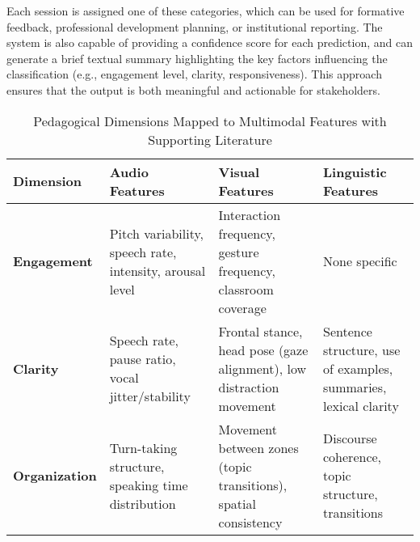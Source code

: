 Each session is assigned one of these categories, which can be used for formative feedback, professional development planning, or institutional reporting. The system is also capable of providing a confidence score for each prediction, and can generate a brief textual summary highlighting the key factors influencing the classification (e.g., engagement level, clarity, responsiveness). This approach ensures that the output is both meaningful and actionable for stakeholders.

\sloppy %
\begin{table*}[htbp]
\centering
\renewcommand{\arraystretch}{1.5} %
\setlength{\tabcolsep}{8pt} %
\caption{Pedagogical Dimensions Mapped to Multimodal Features with Supporting Literature}
\begin{tabularx}{\textwidth}{|>{\raggedright\arraybackslash}X|>{\raggedright\arraybackslash}X|>{\raggedright\arraybackslash}X|>{\raggedright\arraybackslash}X|}
\hline
	\textbf{\normalsize Dimension} & \textbf{\normalsize Audio Features} & \textbf{\normalsize Visual Features} & \textbf{\normalsize Linguistic Features} \\
\hline

	\textbf{Engagement} & 
Pitch variability, speech rate, intensity, arousal level \cite{hou2024encouragement, dmello2012multimodal} & 
Interaction frequency, gesture frequency, classroom coverage \cite{mcneill1992hand, ochoa2016multimodal} & 
None specific \cite{hou2024encouragement, dmello2012multimodal} \\
\hline

	\textbf{Clarity} & 
Speech rate, pause ratio, vocal jitter/stability \cite{falcon2024discourse, rowe1986wait} & 
Frontal stance, head pose (gaze alignment), low distraction movement \cite{mcneill1992hand, ochoa2016multimodal} & 
Sentence structure, use of examples, summaries, lexical clarity \cite{falcon2024discourse, rowe1986wait} \\
\hline

	\textbf{Organization} & 
Turn-taking structure, speaking time distribution \cite{ochoa2016multimodal, dmello2012multimodal} & 
Movement between zones (topic transitions), spatial consistency \cite{mcneill1992hand, ochoa2016multimodal} & 
Discourse coherence, topic structure, transitions \cite{ochoa2016multimodal, dmello2012multimodal} \\
\hline


\end{tabularx}
\end{table*}

